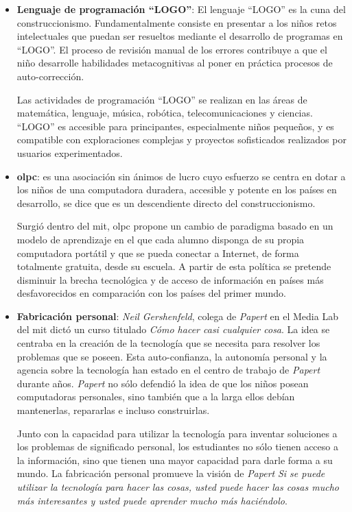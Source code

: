 \begin{itemize}

\item \textbf{Lenguaje de programación \enquote{LOGO}}: El lenguaje
    \enquote{LOGO} es la cuna del construccionismo. Fundamentalmente consiste en
    presentar a los niños retos intelectuales que puedan ser resueltos mediante
    el desarrollo de programas en \enquote{LOGO}. El proceso de revisión manual de los
    errores contribuye a que el niño desarrolle habilidades metacognitivas al
    poner en práctica procesos de auto-corrección\cite{logo:sg}.

    Las actividades de programación \enquote{LOGO} se realizan en las áreas de
    matemática, lenguaje, música, robótica, telecomunicaciones y ciencias.
    \enquote{LOGO} es accesible para principantes, especialmente niños pequeños,
    y es compatible con exploraciones complejas y proyectos sofisticados
    realizados por usuarios experimentados\cite{logo:sg}.
    
\item \textbf{\Gls{olpc}}: es una asociación sin ánimos de lucro cuyo esfuerzo
    se centra en dotar a los niños de una computadora duradera, accesible y
    potente en los países en desarrollo, se dice que es un descendiente directo
    del construccionismo\cite{papertian:const}.
	
    Surgió dentro del \gls{mit}, \Gls{olpc} propone un cambio de paradigma
    basado en un modelo de aprendizaje en el que cada alumno disponga de su
    propia computadora portátil y que se pueda conectar a Internet, de forma
    totalmente gratuita, desde su escuela. A partir de esta política se pretende
    disminuir la brecha tecnológica y de acceso de información en países más
    desfavorecidos en comparación con los países del primer
    mundo\cite{videojuegos:gonzaleztardon}.
	
\item \textbf{Fabricación personal}: \textit{Neil Gershenfeld}, colega de
    \textit{Papert} en el Media Lab del \Gls{mit} dictó un curso titulado
    \emph{Cómo hacer casi cualquier cosa}. La idea se centraba en la creación de
    la tecnología que se necesita para resolver los problemas que se poseen.
    Esta auto-confianza, la autonomía personal y la agencia sobre la tecnología
    han estado en el centro de trabajo de \textit{Papert} durante años.
    \textit{Papert} no sólo defendió la idea de que los niños posean
    computadoras personales, sino también que a la larga ellos debían
    mantenerlas, repararlas e incluso construirlas.

    Junto con la capacidad para utilizar la tecnología para inventar soluciones
    a los problemas de significado personal, los estudiantes no sólo tienen
    acceso a la información, sino que tienen una mayor capacidad para darle
    forma a su mundo. La fabricación personal promueve la visión de
    \textit{Papert} \emph{Si se puede utilizar la tecnología para hacer las
        cosas, usted puede hacer las cosas mucho más interesantes y usted puede
        aprender mucho más haciéndolo}\cite{papertian:const}.

\end{itemize}


